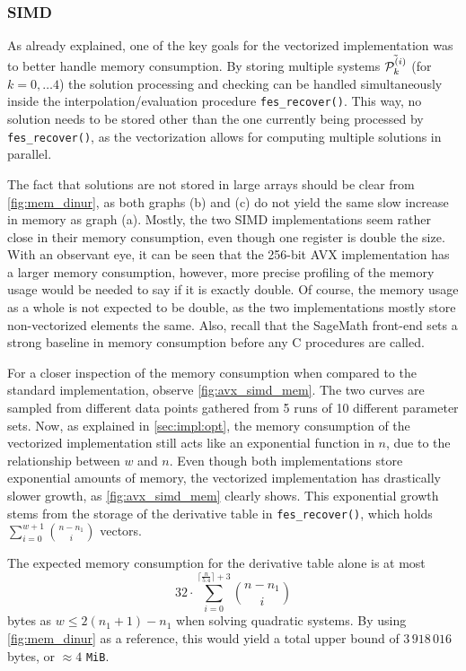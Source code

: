 \subsubsection{SIMD}
As already explained, one of the key goals for the vectorized implementation was to better handle memory consumption. By storing multiple systems $\Tilde{\mathcal{P}^{(i)}_k}$ (for $k = 0, \dots 4$) the solution processing and checking can be handled simultaneously inside the interpolation/evaluation procedure \texttt{fes\_recover()}. This way, no solution needs to be stored other than the one currently being processed by \texttt{fes\_recover()}, as the vectorization allows for computing multiple solutions in parallel.

The fact that solutions are not stored in large arrays should be clear from \cref{fig:mem_dinur}, as both graphs (b) and (c) do not yield the same slow increase in memory as graph (a). Mostly, the two SIMD implementations seem rather close in their memory consumption, even though one register is double the size. With an observant eye, it can be seen that the 256-bit AVX implementation has a larger memory consumption, however, more precise profiling of the memory usage would be needed to say if it is exactly double. Of course, the memory usage as a whole is not expected to be double, as the two implementations mostly store non-vectorized elements the same. Also, recall that the SageMath front-end sets a strong baseline in memory consumption before any C procedures are called. 

For a closer inspection of the memory consumption when compared to the standard implementation, observe \cref{fig:avx_simd_mem}. The two curves are sampled from different data points gathered from 5 runs of 10 different parameter sets. Now, as explained in \cref{sec:impl:opt}, the memory consumption of the vectorized implementation still acts like an exponential function in $n$, due to the relationship between $w$ and $n$. Even though both implementations store exponential amounts of memory, the vectorized implementation has drastically slower growth, as \cref{fig:avx_simd_mem} clearly shows. This exponential growth stems from the storage of the derivative table in \texttt{fes\_recover()}, which holds $\sum_{i = 0}^{w + 1} \binom{n - n_1}{i}$ vectors.

The expected memory consumption for the derivative table alone is at most 
$$
    32 \cdot \sum_{i = 0}^{\lceil \frac{n}{5.4} \rceil + 3} \binom{n - n_1}{i}
$$
bytes as $w \leq 2 (n_1 + 1) - n_1$ when solving quadratic systems. By using \cref{fig:mem_dinur} as a reference, this would yield a total upper bound of $3\,918\,016$ bytes, or $\approx 4$ \texttt{MiB}. 

